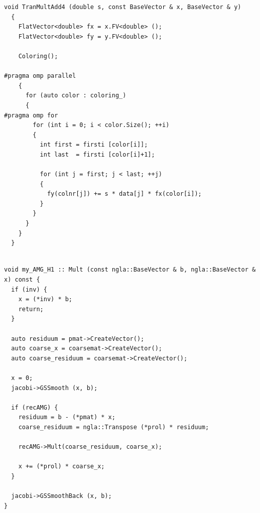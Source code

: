 \documentclass[a4paper,11pt]{scrartcl}
\begin{document}
\begin{lstlisting}
void TranMultAdd4 (double s, const BaseVector & x, BaseVector & y)
  {
    FlatVector<double> fx = x.FV<double> ();
    FlatVector<double> fy = y.FV<double> ();

    Coloring();

#pragma omp parallel
    {
      for (auto color : coloring_)
      {
#pragma omp for
        for (int i = 0; i < color.Size(); ++i)
        {
          int first = firsti [color[i]];
          int last  = firsti [color[i]+1];

          for (int j = first; j < last; ++j)
          {
            fy(colnr[j]) += s * data[j] * fx(color[i]);
          }
        }
      }
    }
  }


\end{lstlisting}

\begin{lstlisting}
void my_AMG_H1 :: Mult (const ngla::BaseVector & b, ngla::BaseVector & x) const {
  if (inv) {
    x = (*inv) * b;
    return;
  }

  auto residuum = pmat->CreateVector();
  auto coarse_x = coarsemat->CreateVector();
  auto coarse_residuum = coarsemat->CreateVector();

  x = 0;
  jacobi->GSSmooth (x, b);

  if (recAMG) {
    residuum = b - (*pmat) * x;
    coarse_residuum = ngla::Transpose (*prol) * residuum;

    recAMG->Mult(coarse_residuum, coarse_x);

    x += (*prol) * coarse_x;
  }

  jacobi->GSSmoothBack (x, b);
}
\end{lstlisting}
\end{document}

